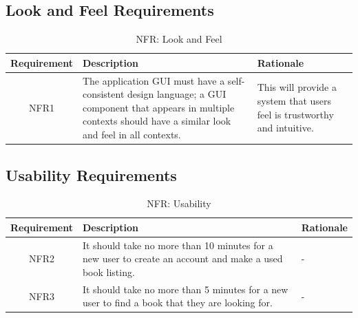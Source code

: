 \documentclass[fullpage]{article}
\begin{document}
\subsection{Look and Feel Requirements}
\begin{table}[h!]
\flushleft
\begin{tabular}{|c|p{6cm}|p{6cm}|}
\hline
 \rowcolor{lightgray} 
\textbf{Requirement} & \textbf{Description} & \textbf{Rationale} \\
\hline
NFR1 &The application GUI must have a self-consistent design language; a GUI component that appears in multiple contexts should have a similar look and feel in all contexts.& This will provide a system that users feel is trustworthy and intuitive.\\
\hline
\end{tabular}
\caption{NFR: Look and Feel}
\end{table}

\newpage

\subsection{Usability Requirements}
\begin{table}[h!]
\flushleft
\begin{tabular}{|c|p{6cm}|p{6cm}|}
\hline
 \rowcolor{lightgray} 
\textbf{Requirement} & \textbf{Description} & \textbf{Rationale} \\
\hline
NFR2 & It should take no more than 10 minutes for a new user to create an account and make a used book listing. & - \\
\hline
NFR3 & It should take no more than 5 minutes for a new user to find a book that they are looking for. & -\\
\hline
\end{tabular}
\caption{NFR: Usability}
\end{table}
\end{document}
